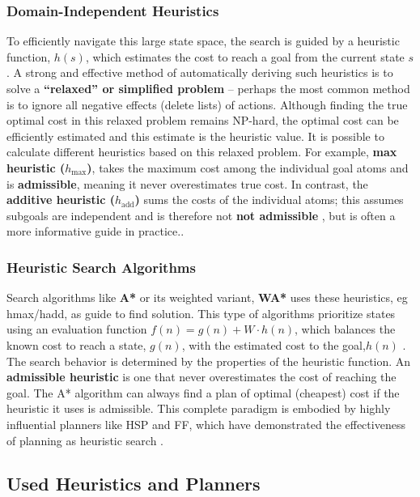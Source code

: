 \documentclass[12pt, a4paper, oneside]{report} %
\begin{document}
\subsubsection*{Domain-Independent Heuristics}


To efficiently navigate this large state space, the search is guided by a heuristic function, $h(s)$, which estimates the cost to reach a goal from the current state $s$.  A strong and effective method of automatically deriving such heuristics is to solve a \textbf{ “relaxed” or simplified problem} -- perhaps the most common method is to ignore all negative effects (delete lists) of actions. Although finding the true optimal cost in this relaxed problem remains NP-hard, the optimal cost can be efficiently estimated and this estimate is the heuristic value\cite{bonet2001planning}. It is possible to calculate different heuristics based on this relaxed problem. For example, \textbf{max heuristic ($h_{\max}$)}, takes the maximum cost among the individual goal atoms and is \textbf{admissible}, meaning it never overestimates true cost. In contrast, the \textbf{additive heuristic ($h_{\text{add}}$)}  sums the costs of the individual atoms; this assumes subgoals are independent and is therefore not \textbf{not admissible} , but is often a more informative guide in practice.\cite{bonet2001planning}.

\subsubsection*{Heuristic Search Algorithms}


Search algorithms like  \textbf{A*} or its weighted variant, \textbf{WA*} uses these heuristics, eg hmax/hadd, as guide to find solution. This type of algorithms prioritize states using an evaluation function $f(n) = g(n) + W \cdot h(n)$, which balances the known cost to reach a state,  $g(n)$, with the estimated cost to the goal,$h(n)$ \cite{bonet2001planning}. The search behavior is determined by the properties of the heuristic function. An \textbf{admissible heuristic} is one that never overestimates the cost of reaching the goal. The A* algorithm can always find a plan of optimal (cheapest) cost if the heuristic it uses is admissible. This complete paradigm is embodied by highly influential planners like HSP and FF, which have demonstrated the effectiveness of planning as heuristic search \cite{koenig2002heuristic}.


\subsection{Used Heuristics and Planners}
\label{sec:heuristics_and_planners}
\end{document}
